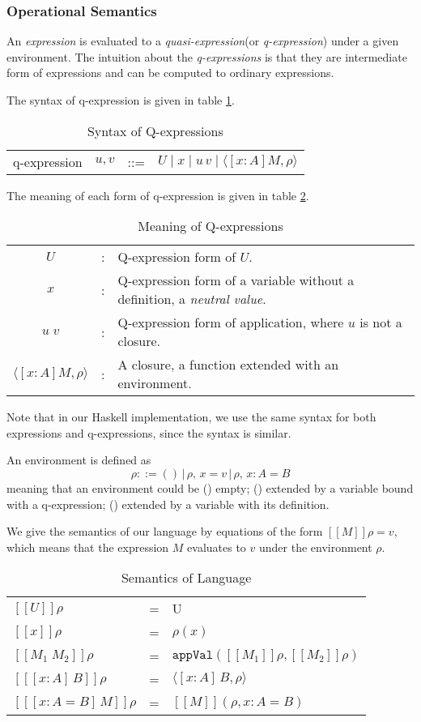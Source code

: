 \documentclass{article}
\theoremstyle{remark}
\begin{document}
\subsubsection{Operational Semantics}
An \emph{expression} is evaluated to a \emph{quasi-expression}(or \emph{q-expression}) under a given environment. The intuition about the \emph{q-expressions} is that they are intermediate form of expressions and can be computed to ordinary expressions.

The syntax of q-expression is given in table \ref{tab:q-exp1}.
\begin{table}[h]
  \centering
  \begin{tabular}{l l l l}
    q-expression & $u, v$ & ::= & $U \mid x \mid u\, v \mid \langle [x : A] M, \rho \rangle $
  \end{tabular}
  \caption{Syntax of Q-expressions}
  \label{tab:q-exp1}
\end{table}

The meaning of each form of q-expression is given in table \ref{tab:q-exp2}.
\begin{table}[h]
  \centering
  \begin{tabular}{c l p{8cm}}
    $U$ & : & Q-expression form of $U$.\\
    $x$ & : & Q-expression form of a variable without a definition, a \emph{neutral value}.\\
    $u \; v$ & : &  Q-expression form of application, where $u$ is not a closure.\\
    $\langle [x : A] M, \rho \rangle$ & : & A closure, a function extended with an environment.\\ 
  \end{tabular}
  \caption{Meaning of Q-expressions}
  \label{tab:q-exp2}
\end{table}

Note that in our Haskell implementation, we use the same syntax for both expressions and q-expressions, since the syntax is similar.

An environment is defined as
\[
\rho ::= ()\,|\,\rho,\,x = v\,|\,\rho,\,x : A = B
\]
meaning that an environment could be () empty; () extended by a variable bound with a q-expression; () extended by a variable with its definition.

We give the semantics of our language by equations of the form $[\![M]\!]\rho = v$, which means that the expression $M$ evaluates to $v$ under the environment $\rho$.
\begin{table}[h]
  \centering
  \begin{tabular}{l l l}
    $[\![U]\!]\rho$ & = & U \\
    $[\![x]\!]\rho$ & = & $\rho(x)$ \\
    $[\![M_1 \; M_2]\!]\rho$ & = & $\texttt{appVal}([\![M_1]\!]\rho, [\![M_2]\!]\rho)$ \\
    $[\![[x : A]\,B]\!]\rho$ & = & $\langle[x : A]\,B, \rho\rangle$ \\
    $[\![[x : A = B]\,M]\!]\rho$ & = & $[\![M]\!](\rho, x : A = B)$ 
  \end{tabular}
  \caption{Semantics of Language}
\end{table}
\end{document}
